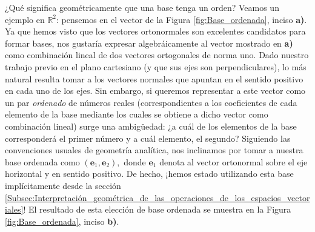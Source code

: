 \documentclass[12pt]{article}
\begin{document}
¿Qué significa geométricamente que una base tenga un orden? Veamos un ejemplo en $\mathbb{R}^2$: pensemos en el vector de la Figura \ref{fig:Base_ordenada}, inciso \textbf{a)}. Ya que hemos visto que los vectores ortonormales son excelentes candidatos para formar bases, nos gustaría expresar algebráicamente al vector mostrado en \textbf{a)} como combinación lineal de dos vectores ortogonales de norma uno. Dado nuestro trabajo previo en el plano cartesiano (y que sus ejes son perpendiculares), lo más natural resulta tomar a los vectores normales que apuntan en el sentido positivo en cada uno de los ejes. Sin embargo, si queremos representar a este vector como un par \emph{ordenado} de números reales (correspondientes a los coeficientes de cada elemento de la base mediante los cuales se obtiene a dicho vector como combinación lineal) surge una ambigüedad: ¿a cuál de los elementos de la base corresponderá el primer número y a cuál elemento, el segundo? Siguiendo las convenciones usuales de geometría analítica, nos inclinamos por tomar a nuestra base ordenada como $(\mathbf{e}_1,\mathbf{e}_2),$ donde $\mathbf{e}_1$ denota al vector ortonormal sobre el eje horizontal y en sentido positivo. De hecho, ¡hemos estado utilizando esta base implícitamente desde la sección \ref{Subsec:Interpretación_geométrica_de_las_operaciones_de_los_espacios_vectoriales}! El resultado de esta elección de base ordenada se muestra en la Figura \ref{fig:Base_ordenada}, inciso \textbf{b)}.
\end{document}
